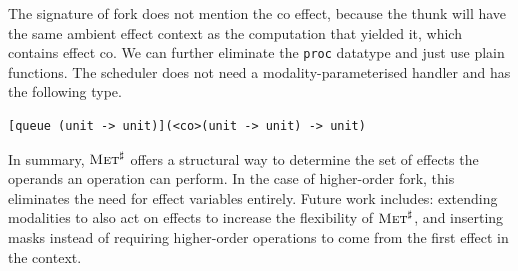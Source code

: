 \documentclass[sigplan, nonacm, natbib = false, review, screen]{acmart}
\newcommand{\Met}{\textsc{Met}\xspace}
\newcommand{\MetHO}{$\Met^\sharp$\xspace}
\begin{document}
The signature of \textsf{fork} does not mention the \textsf{co}
effect, because the thunk will have the same ambient effect context as
the computation that yielded it, which contains effect \textsf{co}.
%
We can further eliminate the \lstinline{proc} datatype and just use
plain functions.
%
The scheduler does not need a modality-parameterised handler and
has the following type.
\begin{lstlisting}[style=metl]
  [queue (unit -> unit)](<co>(unit -> unit) -> unit)
\end{lstlisting}

In summary, \MetHO offers a structural way to determine the set of effects
the operands an operation can perform. In the case of higher-order
fork, this eliminates the need for effect variables entirely. Future
work includes: extending modalities to also act on effects to increase
the flexibility of \MetHO, and inserting masks instead of requiring
higher-order operations to come from the first effect in the context.
%
%
%

%



\end{document}
